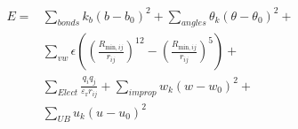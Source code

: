 \documentclass[paper=a5,fontsize=12pt]{scrbook}
\begin{document}
            \begin{preview}

            
            \begin{align*}
            E = &\sum_{bonds} k_b (b - b_0)^2 + \sum_{angles} \theta_k (\theta - \theta_0)^2 + \\
            & \sum_{vw} \epsilon(  (\frac{R_{\text{min},ij}}{r_{ij}})^{12} - (\frac{R_{\text{min},ij}}{r_{ij}})^5) + \\
            & \sum_{Elect} \frac{q_i q_j}{\varepsilon_{\text{r}} r_{ij}} + \sum_{improp} w_k (w - w_0)^2 + \\
            & \sum_{UB} u_k (u - u_0)^2
            \end{align*}
            


            \end{preview}
            
\end{document}
